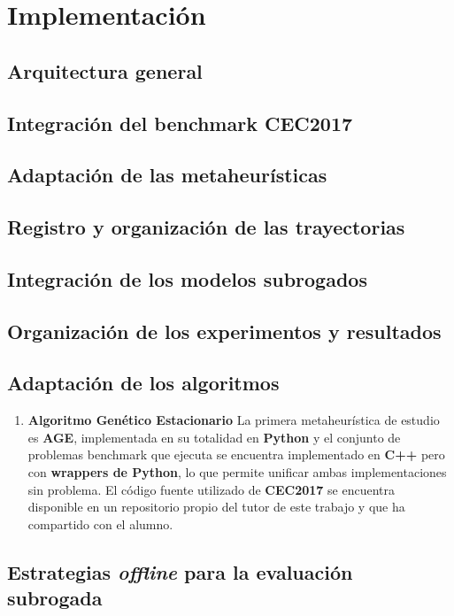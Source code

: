 \chapter{Implementación}
\label{chap:implementacion}



\section{Arquitectura general}
\section{Integración del benchmark CEC2017}
\section{Adaptación de las metaheurísticas}
\section{Registro y organización de las trayectorias}
\section{Integración de los modelos subrogados}
\section{Organización de los experimentos y resultados}

\section{Adaptación de los algoritmos}

\begin{enumerate}
    \item \textbf{Algoritmo Genético Estacionario} La primera metaheurística de estudio es \textbf{AGE}, implementada en su totalidad en \textbf{Python} y el conjunto de problemas benchmark que ejecuta se encuentra implementado en \textbf{C++} pero con \textbf{wrappers de Python}, lo que permite unificar ambas implementaciones sin problema. El código fuente utilizado de \textbf{CEC2017} se encuentra disponible en un repositorio propio del tutor de este trabajo y que ha compartido con el alumno.
\end{enumerate}




\section{Estrategias \textit{offline} para la evaluación subrogada}

